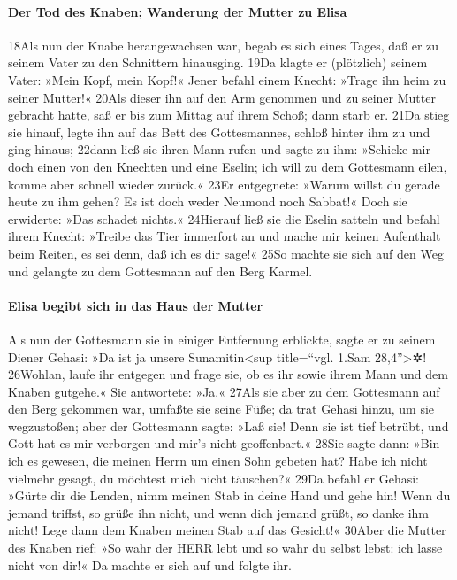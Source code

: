 \hypertarget{der-tod-des-knaben-wanderung-der-mutter-zu-elisa}{%
\paragraph{Der Tod des Knaben; Wanderung der Mutter zu
Elisa}\label{der-tod-des-knaben-wanderung-der-mutter-zu-elisa}}

18Als nun der Knabe herangewachsen war, begab es sich eines Tages, daß
er zu seinem Vater zu den Schnittern hinausging. 19Da klagte er
(plötzlich) seinem Vater: »Mein Kopf, mein Kopf!« Jener befahl einem
Knecht: »Trage ihn heim zu seiner Mutter!« 20Als dieser ihn auf den Arm
genommen und zu seiner Mutter gebracht hatte, saß er bis zum Mittag auf
ihrem Schoß; dann starb er. 21Da stieg sie hinauf, legte ihn auf das
Bett des Gottesmannes, schloß hinter ihm zu und ging hinaus; 22dann ließ
sie ihren Mann rufen und sagte zu ihm: »Schicke mir doch einen von den
Knechten und eine Eselin; ich will zu dem Gottesmann eilen, komme aber
schnell wieder zurück.« 23Er entgegnete: »Warum willst du gerade heute
zu ihm gehen? Es ist doch weder Neumond noch Sabbat!« Doch sie
erwiderte: »Das schadet nichts.« 24Hierauf ließ sie die Eselin satteln
und befahl ihrem Knecht: »Treibe das Tier immerfort an und mache mir
keinen Aufenthalt beim Reiten, es sei denn, daß ich es dir sage!« 25So
machte sie sich auf den Weg und gelangte zu dem Gottesmann auf den Berg
Karmel.

\hypertarget{elisa-begibt-sich-in-das-haus-der-mutter}{%
\paragraph{Elisa begibt sich in das Haus der
Mutter}\label{elisa-begibt-sich-in-das-haus-der-mutter}}

Als nun der Gottesmann sie in einiger Entfernung erblickte, sagte er zu
seinem Diener Gehasi: »Da ist ja unsere Sunamitin\textless sup
title=``vgl. 1.Sam 28,4''\textgreater✲! 26Wohlan, laufe ihr entgegen und
frage sie, ob es ihr sowie ihrem Mann und dem Knaben gutgehe.« Sie
antwortete: »Ja.« 27Als sie aber zu dem Gottesmann auf den Berg gekommen
war, umfaßte sie seine Füße; da trat Gehasi hinzu, um sie wegzustoßen;
aber der Gottesmann sagte: »Laß sie! Denn sie ist tief betrübt, und Gott
hat es mir verborgen und mir's nicht geoffenbart.« 28Sie sagte dann:
»Bin ich es gewesen, die meinen Herrn um einen Sohn gebeten hat? Habe
ich nicht vielmehr gesagt, du möchtest mich nicht täuschen?« 29Da befahl
er Gehasi: »Gürte dir die Lenden, nimm meinen Stab in deine Hand und
gehe hin! Wenn du jemand triffst, so grüße ihn nicht, und wenn dich
jemand grüßt, so danke ihm nicht! Lege dann dem Knaben meinen Stab auf
das Gesicht!« 30Aber die Mutter des Knaben rief: »So wahr der HERR lebt
und so wahr du selbst lebst: ich lasse nicht von dir!« Da machte er sich
auf und folgte ihr.


